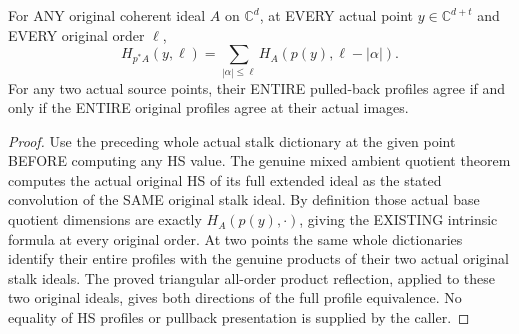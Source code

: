 \begin{theorem}
\label{hir:actual-coordinate-projection-intrinsic-hs-convolution-and-reflection}
\leanok
For ANY original coherent ideal $A$ on $\mathbb C^d$, at EVERY actual point
$y\in\mathbb C^{d+t}$ and EVERY original order $\ell$,
\[
 H_{p^*A}(y,\ell)=\sum_{|\alpha|\le\ell}H_A(p(y),\ell-|\alpha|).
\]
For any two actual source points, their ENTIRE pulled-back profiles agree
if and only if the ENTIRE original profiles agree at their actual images.
\end{theorem}
\begin{proof}
Use the preceding whole actual stalk dictionary at the given point BEFORE
computing any HS value. The genuine mixed ambient quotient theorem computes
the actual original HS of its full extended ideal as the stated convolution
of the SAME original stalk ideal. By definition those actual base quotient
dimensions are exactly $H_A(p(y),\cdot)$, giving the EXISTING intrinsic
formula at every original order. At two points the same whole dictionaries
identify their entire profiles with the genuine products of their two
actual original stalk ideals. The proved triangular all-order product
reflection, applied to these two original ideals, gives both directions of
the full profile equivalence. No equality of HS profiles or pullback
presentation is supplied by the caller.
\end{proof}

